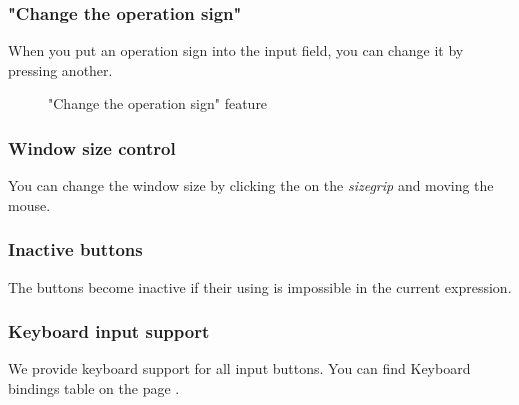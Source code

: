 \documentclass[a5paper, 10pt]{article}
\begin{document}
        \subsubsection{"Change the operation sign"}
            When you put an operation sign into the input field, you can change it by pressing another.
            \begin{figure}[h]
                \centering
                \caption{"Change the operation sign" feature}
                \label{pic:change_the_operation_sign}
            \end{figure}

        \subsubsection{Window size control}
            You can change the window size by clicking the  on the \emph{sizegrip} and moving the mouse.

        \subsubsection{Inactive buttons}
            The buttons become inactive if their using is impossible in the current expression.

        \subsubsection{Keyboard input support}
            We provide keyboard support for all input buttons. You can find Keyboard bindings table on the page \pageref{tab:Keyboard bindings}.
\end{document}
